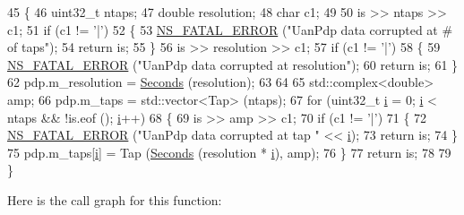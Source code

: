 \begin{DoxyCode}
45 \{
46   uint32\_t ntaps;
47   \textcolor{keywordtype}{double} resolution;
48   \textcolor{keywordtype}{char} c1;
49 
50   is >> ntaps >> c1;
51   \textcolor{keywordflow}{if} (c1 != \textcolor{charliteral}{'|'})
52     \{
53       \hyperlink{group__fatal_ga5131d5e3f75d7d4cbfd706ac456fdc85}{NS\_FATAL\_ERROR} (\textcolor{stringliteral}{"UanPdp data corrupted at # of taps"});
54       \textcolor{keywordflow}{return} is;
55     \}
56   is >> resolution >> c1;
57   \textcolor{keywordflow}{if} (c1 != \textcolor{charliteral}{'|'})
58     \{
59       \hyperlink{group__fatal_ga5131d5e3f75d7d4cbfd706ac456fdc85}{NS\_FATAL\_ERROR} (\textcolor{stringliteral}{"UanPdp data corrupted at resolution"});
60       \textcolor{keywordflow}{return} is;
61     \}
62   pdp.m\_resolution = \hyperlink{group__timecivil_ga33c34b816f8ff6628e33d5c8e9713b9e}{Seconds} (resolution);
63 
64 
65   std::complex<double> amp;
66   pdp.m\_taps = std::vector<Tap> (ntaps);
67   \textcolor{keywordflow}{for} (uint32\_t \hyperlink{bernuolliDistribution_8m_a6f6ccfcf58b31cb6412107d9d5281426}{i} = 0; \hyperlink{bernuolliDistribution_8m_a6f6ccfcf58b31cb6412107d9d5281426}{i} < ntaps && !is.eof (); \hyperlink{bernuolliDistribution_8m_a6f6ccfcf58b31cb6412107d9d5281426}{i}++)
68     \{
69       is >> amp >> c1;
70       \textcolor{keywordflow}{if} (c1 != \textcolor{charliteral}{'|'})
71         \{
72           \hyperlink{group__fatal_ga5131d5e3f75d7d4cbfd706ac456fdc85}{NS\_FATAL\_ERROR} (\textcolor{stringliteral}{"UanPdp data corrupted at tap "} << \hyperlink{bernuolliDistribution_8m_a6f6ccfcf58b31cb6412107d9d5281426}{i});
73           \textcolor{keywordflow}{return} is;
74         \}
75       pdp.m\_taps[\hyperlink{bernuolliDistribution_8m_a6f6ccfcf58b31cb6412107d9d5281426}{i}] = Tap (\hyperlink{group__timecivil_ga33c34b816f8ff6628e33d5c8e9713b9e}{Seconds} (resolution * \hyperlink{bernuolliDistribution_8m_a6f6ccfcf58b31cb6412107d9d5281426}{i}), amp);
76     \}
77   \textcolor{keywordflow}{return} is;
78 
79 \}
\end{DoxyCode}


Here is the call graph for this function\+:


